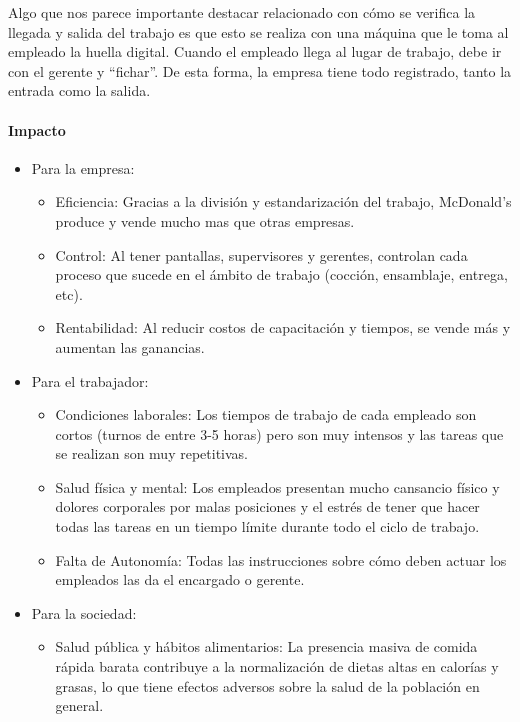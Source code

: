\documentclass[12pt]{article}
\begin{document}
  Algo que nos parece importante destacar relacionado con cómo se verifica la llegada y salida del trabajo es que esto se realiza con una máquina que le toma al empleado la huella digital. Cuando el empleado llega al lugar de trabajo, debe ir con el gerente y ``fichar''. De esta forma, la empresa tiene todo registrado, tanto la entrada como la salida.

  \paragraph{Impacto}\mbox{}
  \begin{itemize}
    \item Para la empresa:\begin{itemize}
      \item Eficiencia: Gracias a la división y estandarización del trabajo, McDonald's produce y vende mucho mas que otras empresas.

      \item Control: Al tener pantallas, supervisores y gerentes, controlan cada proceso que sucede en el ámbito de trabajo (cocción, ensamblaje, entrega, etc).

      \item Rentabilidad: Al reducir costos de capacitación y tiempos, se vende más y aumentan las ganancias.
    \end{itemize}

    \item Para el trabajador: \begin{itemize}
      \item Condiciones laborales: Los tiempos de trabajo de cada empleado son cortos (turnos de entre 3-5 horas) pero son muy intensos y las tareas que se realizan son muy repetitivas.

      \item Salud física y mental: Los empleados presentan mucho cansancio físico y dolores corporales por malas posiciones y el estrés de tener que hacer todas las tareas en un tiempo límite durante todo el ciclo de trabajo.

      \item Falta de Autonomía: Todas las instrucciones sobre cómo deben actuar los empleados las da el encargado o gerente.
    \end{itemize}

    \item Para la sociedad: \begin{itemize}
      \item Salud pública y hábitos alimentarios: La presencia masiva de comida rápida barata contribuye a la normalización de dietas altas en calorías y grasas, lo que tiene efectos adversos sobre la salud de la población en general.


\end{itemize}
\end{itemize}
\end{document}
